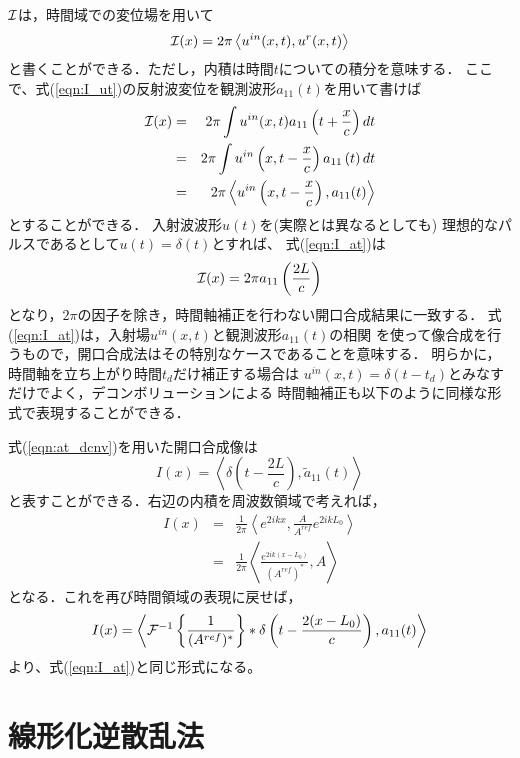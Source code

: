 \documentclass[10pt,a4j,dvipdfmx]{jarticle}
\begin{document}
${\cal I}$は，時間域での変位場を用いて
\begin{equation}
	{\cal I}(x)= 2\pi \left< u^{in}(x,t), u^{r}(x,t)\right>
	\label{eqn:I_ut}
\end{equation}
と書くことができる．ただし，内積は時間$t$についての積分を意味する．
ここで、式(\ref{eqn:I_ut})の反射波変位を観測波形$a_{11}(t)$を用いて書けば
\begin{eqnarray}
	{\cal I}(x) &= & 
	2\pi \int u^{in}(x,t) a_{11}\left(t+\frac{x}{c}\right) dt
	\\
	&=&
	2\pi \int u^{in}\left(x,t-\frac{x}{c}\right) a_{11}\left(t\right) dt \\
	&=&
	2\pi \left< u^{in}\left(x,t-\frac{x}{c}\right), a_{11}(t) \right>
	\label{eqn:I_at}
\end{eqnarray}
とすることができる．
入射波波形$u(t)$を(実際とは異なるとしても)
理想的なパルスであるとして$u(t)=\delta(t)$とすれば、
式(\ref{eqn:I_at})は
\begin{equation}
	{\cal I}(x)=2\pi a_{11}\left(\frac{2L}{c}\right)
	\label{eqn:}
\end{equation}
となり，$2\pi$の因子を除き，時間軸補正を行わない開口合成結果に一致する．
式(\ref{eqn:I_at})は，入射場$u^{in}(x,t)$と観測波形$a_{11}(t)$の相関
を使って像合成を行うもので，開口合成法はその特別なケースであることを意味する．
明らかに，時間軸を立ち上がり時間$t_d$だけ補正する場合は
$u^{in}(x,t)=\delta(t-t_d)$とみなすだけでよく，デコンボリューションによる
時間軸補正も以下のように同様な形式で表現することができる．

式(\ref{eqn:at_dcnv})を用いた開口合成像は
\begin{equation}
	I(x)=\left< \delta\left(t-\frac{2L}{c}\right), \tilde a_{11}(t) \right>
	\label{eqn:}
\end{equation}
と表すことができる．右辺の内積を周波数領域で考えれば，
\begin{eqnarray}
	I(x) &=&
	\frac{1}{2\pi}\left< e^{2ikx}, \frac{A}{A^{ref}}e^{2ikL_0} \right> \\
	&=&
	\frac{1}{2\pi}\left< \frac{e^{2ik(x-L_0)}}{(A^{ref})^*}, A \right> 
	\label{eqn:}
\end{eqnarray}
となる．これを再び時間領域の表現に戻せば，
\begin{equation}
	I(x)= \left< {\cal F}^{-1}\left\{ \frac{1}{(A^{ref})^*}\right\} *\delta \left( t-\frac{2(x-L_0)}{c}\right), a_{11}(t) \right>
	\label{eqn:Ix_dcnv}
\end{equation}
より、式(\ref{eqn:I_at})と同じ形式になる。
\section{線形化逆散乱法}
\end{document}
